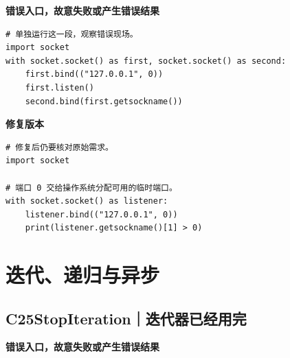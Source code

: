 


\textbf{错误入口，故意失败或产生错误结果}

\begin{lstlisting}[style=errorcode,title={错误复现（故意失败或错误结果）：\code{case_24_bad.py.txt}}]
# 单独运行这一段，观察错误现场。
import socket
with socket.socket() as first, socket.socket() as second:
    first.bind(("127.0.0.1", 0))
    first.listen()
    second.bind(first.getsockname())
\end{lstlisting}

\textbf{修复版本}

\begin{lstlisting}[title={\code{case_24.py}}]
# 修复后仍要核对原始需求。
import socket

# 端口 0 交给操作系统分配可用的临时端口。
with socket.socket() as listener:
    listener.bind(("127.0.0.1", 0))
    print(listener.getsockname()[1] > 0)
\end{lstlisting}


\section{迭代、递归与异步}

\subsection*{C25\enspace StopIteration｜迭代器已经用完}





\textbf{错误入口，故意失败或产生错误结果}

